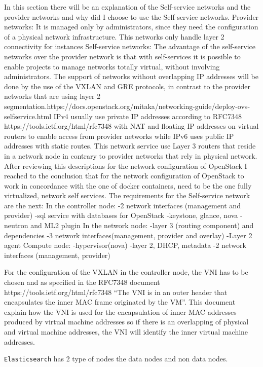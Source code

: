 In this section there will be an explanation of the Self-service networks and the provider networks and why did I choose to use the Self-service networks.
Provider networks:
It is managed only by administrators, since they need the configuration of a physical network infrastructure. This networks only handle layer 2 connectivity for instances
Self-service networks: 
The advantage of the self-service networks over the provider network is that with self-services it is possible to enable projects to manage networks totally virtual, without involving administrators.
The support of networks without overlapping IP addresses will be done by the use of the VXLAN and GRE protocols, in contrast to the provider networks that are using layer 2 segmentation.https://docs.openstack.org/mitaka/networking-guide/deploy-ovs-selfservice.html
IPv4 usually use private IP addresses according to RFC7348 https://tools.ietf.org/html/rfc7348 with NAT and floating IP addresses on virtual routers to enable access from provider networks while IPv6 uses public IP addresses with static routes. 
This network service use Layer 3 routers that reside in a network node in contrary to provider networks that rely in physical network. 
After reviewing this descriptions for the network configuration of OpenStack I reached to the conclusion that for the network configuration of OpenStack to work in concordance with the one of docker containers, need to be the one fully virtualized, network self services.
The requirements for the Self-service network are the next:
In the controller node: 
-2 network interfaces (management and provider)
-sql service with  databases for OpenStack
-keystone, glance, nova 
-neutron and ML2 plugin
In the network node:
-layer 3 (routing component) and dependencies
-3 network interfaces(management, provider and overlay)
-Layer 2 agent
Compute node: 
-hypervisor(nova)
-layer 2, DHCP, metadata
-2 network interfaces (management, provider)

For the configuration of the VXLAN in the controller node, the VNI has to be chosen and as specified in the RFC7348 document https://tools.ietf.org/html/rfc7348 
“The VNI is in an outer header that encapsulates the inner MAC frame originated by the VM”. 
This document explain how the VNI is used for the encapsulation of inner MAC addresses produced by virtual machine addresses so if there is an overlapping of physical and virtual machine addresses, the VNI will identify the inner virtual machine addresses.



\texttt{Elasticsearch}  has 2 type of nodes the data nodes and non data nodes.
\\

